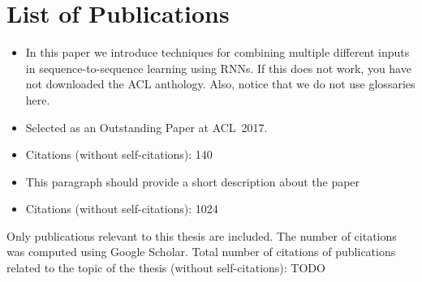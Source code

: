 \chapter*{List of Publications}


\noindent{}
\begin{itemize}[noitemsep,topsep=0pt]

\item In this paper we introduce techniques for combining multiple different
  inputs in sequence-to-sequence learning using RNNs. If this does not work,
  you have not downloaded the ACL anthology. Also, notice that we do not use
  glossaries here.
\item Selected as an Outstanding Paper at ACL~2017.

\item Citations (without self-citations): 140
\end{itemize}\vspace{.5\baselineskip}

\noindent{}
\begin{itemize}[noitemsep,topsep=0pt]

\item This paragraph should provide a short description about the paper
\item Citations (without self-citations): 1024

\end{itemize}\vspace{.5\baselineskip}

\vfill

\noindent Only publications relevant to this thesis are included. The number of
citations was computed using Google Scholar. Total number of citations of
publications related to the topic of the thesis (without self-citations):
{\large TODO} %
